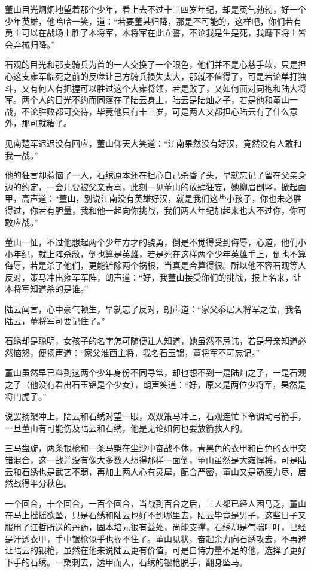 董山目光炯炯地望着那个少年，看上去不过十三四岁年纪，却是英气勃勃，好一个少年英雄，他哈哈一笑，道：“若要董某归降，那是不可能的，这样吧，你们若有勇士可以在战场上胜了本将军，本将军在此立誓，不论我是生是死，我麾下将士皆会弃械归降。”

石观的目光和那支骑兵为首的一人交换了一个眼色，他们并不是心慈手软，只是担心这支雍军临死之前的反噬让己方骑兵损失太大，那就不值得了，可是若论单打独斗，又有何人有把握可以胜过这个大雍将领，若是败了，又如何面对同袍和陆大将军。两个人的目光不约而同落在了陆云身上，陆云是陆灿之子，若是他和董山一战，不论胜败都可交待，毕竟他只有十三岁，可是两人又都担心陆云有了什么意外，那可就糟了。

见南楚军迟迟没有回应，董山仰天大笑道：“江南果然没有好汉，竟然没有人敢和我一战。”

他的狂言却惹恼了一人，石绣原本还在担心自己杀昏了头，早就忘记了留在父亲身边的约定，一会儿要被父亲责骂，此刻一见董山的放肆狂妄，她柳眉倒竖，掀起面甲，高声道：“董山，别说江南没有英雄好汉，就是我们这些小孩子，你也未必胜得过，你若有胆量，我和他一起向你挑战，我们两人年纪加起来也大不过你，你可敢应战。”

董山一怔，不过他想起两个少年方才的骁勇，倒是不觉得受到侮辱，心道，他们小小年纪，就上阵杀敌，倒也算是英雄，若是死在这样两个少年英雄手上，倒也不算侮辱，若是杀了他们，更能铲除两个祸根，当真是合算得很。所以他不容石观等人反对，策马冲出雍军军阵，朗声道：“好，我董山接受你们的挑战，报上名来，让本将军知道杀的是谁。”

陆云闻言，心中豪气顿生，早就忘了反对，朗声道：“家父忝居大将军之位，我名陆云，董将军可要记住了。”

石绣却是聪明，女孩子的名字怎可随便让人知道，她虽然不忌讳，若是母亲知道必然恼怒，便扬声道：“家父淮西主将，我名石玉锦，董将军不可忘记。”

董山虽然早已料到这两个少年身份不同寻常，却也想不到一是陆灿之子，一是石观之子（他没有看出石玉锦是个少女），朗声笑道：“好，原来是两位少将军，果然是将门虎子。”

说罢扬槊冲上，陆云和石绣对望一眼，双双策马冲上，石观连忙下令调动弓箭手，一旦董山有可能伤及陆云和石绣，他是无论如何也要放箭救人的。

三马盘旋，两条银枪和一条马槊在尘沙中奋战不休，青黑色的衣甲和白色的衣甲交错混合，这一战并没有像大多数人想得那样一面倒，董山虽然是大雍悍将，可是陆云和石绣也是武艺不弱，再加上两人心有灵犀，配合严密，董山又是筋疲力尽，居然战得平分秋色。

一个回合，十个回合，一百个回合，当战到百合之后，三人都已经人困马乏，董山在马上摇摇欲坠，只是石绣和陆云也好不到哪里去，陆云毕竟是男子，这些日子又服用了江哲所送的丹药，固本培元很有益处，尚能支撑，石绣却是气喘吁吁，已经是汗透衣甲，手中银枪似乎也握不住了。董山见状，奋起余力向石绣攻去，不再避让陆云的银枪，虽然在他来说陆云更有价值，可是自恃力量不足的他，选择了更好下手的石绣。一槊刺去，透甲而入，石绣的银枪脱手，翻身坠马。

